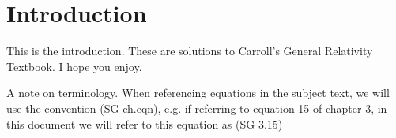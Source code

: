 \chapter*{Introduction}
\label{intro}

This is the introduction. These are solutions to Carroll's General Relativity Textbook. I hope you enjoy. 

A note on terminology. When referencing equations in the subject text, we will use the convention (SG ch.eqn), e.g. if referring to equation 15 of chapter 3, in this document we will refer to this equation as (SG 3.15)

